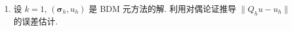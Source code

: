 \begin{enumerate}
\item 设 $k=1$, $(\boldsymbol{\sigma}_h, u_h)$ 是 BDM 元方法的解. 利用对偶论证推导 $\|Q_hu-u_h\|$ 的误差估计.
\end{enumerate}

